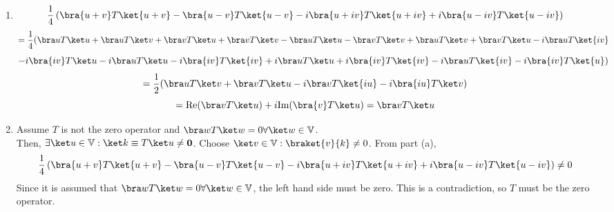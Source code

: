 \begin{sol}
\begin{enumerate}[label=\textbf{(\alph*)}]
\item
$$\frac{1}{4}\left(\bra{u+v}T\ket{u+v}-\bra{u-v}T\ket{u-v}-i\bra{u+iv}T\ket{u+iv}+i\bra{u-iv}T\ket{u-iv}\right)$$
$$=\frac{1}{4}(\bra uT\ket u+\bra uT\ket v+\bra vT\ket u+\bra vT\ket v-\bra uT\ket u-\bra vT\ket v+\bra uT\ket v+\bra vT\ket u-i\bra uT\ket{iv}$$$$-i\bra{iv}T\ket u-i\bra uT\ket u-i\bra{iv}T\ket{iv}+i\bra u T\ket u+i\bra {iv}T\ket{iv}-i\bra uT\ket{iv}-i\bra{iv}T\ket{u})$$
$$=\frac{1}{2}(\bra uT\ket v+\bra vT\ket u-i\bra vT\ket{iu}-i\bra{iu}T\ket v)$$
$$=\text{Re}(\bra vT\ket u)+i\text{Im}(\bra{v}T\ket u)=\bra vT\ket u$$
\item
Assume $T$ is not the zero operator and $\bra w T\ket w=0\forall\ket w\in\mathbb V$.\\ Then, $\exists\ket u\in \mathbb V:\ket k\equiv T\ket u\neq \mathbf 0$. Choose $\ket v\in\mathbb V:\braket{v}{k}\neq 0$. From part (a), 
$$\frac{1}{4}\left(\bra{u+v}T\ket{u+v}-\bra{u-v}T\ket{u-v}-i\bra{u+iv}T\ket{u+iv}+i\bra{u-iv}T\ket{u-iv}\right)\neq 0$$
Since it is assumed that $\bra w T\ket w=0\forall\ket w\in\mathbb V$, the left hand side must be zero. This is a contradiction, so $T$ must be the zero operator.
\end{enumerate}
\end{sol}